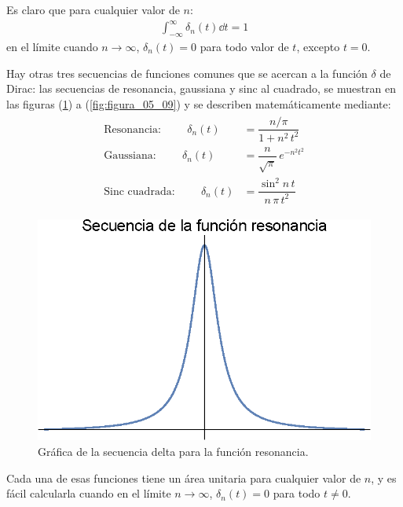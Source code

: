 Es claro que para cualquier valor de $n$:
\begin{align}
\int_{-\infty}^{\infty} \delta_{n} (t) \dd{t} = 1
\label{eq:ecuacion_05_12}
\end{align}
en el límite cuando $n \to \infty$, $\delta_{n}(t) = 0$ para todo valor de $t$, excepto $t = 0$. 
\par
Hay otras tres secuencias de funciones comunes que se acercan a la función $\delta$ de Dirac: las secuencias de resonancia, gaussiana y sinc al cuadrado, se muestran en las figuras (\ref{fig:figura_05_07}) a (\ref{fig:figura_05_09}) y se describen matemáticamente mediante:
\begin{align}
\begin{aligned}
\mbox{Resonancia:} \hspace{1cm} \delta_{n}(t) &= \dfrac{n/\pi}{1 + n^{2} \, t^{2}} \\[0.5em]
\mbox{Gaussiana:} \hspace{1cm} \delta_{n}(t) &= \dfrac{n}{\sqrt{\pi}} \, e^{-n^{2} t^{2}} \\[0.5em]
\mbox{Sinc cuadrada:} \hspace{1cm} \delta_{n}(t) &= \dfrac{\sin^{2} n \, t}{n \, \pi \, t^{2}} 
\end{aligned}
\label{eq:ecuacion_05_13}
\end{align}

\begin{figure}[H]
    \centering
    \includegraphics[scale=1.4]{Imagenes/secuencia_Delta_05.eps}
    \caption{Gráfica de la secuencia delta para la función resonancia.}
    \label{fig:figura_05_07}
\end{figure}

Cada una de esas funciones tiene un área unitaria para cualquier valor de $n$, y es fácil calcularla cuando en el límite $n \to \infty$, $\delta_{n} (t) = 0$ para todo $t \neq 0$.


